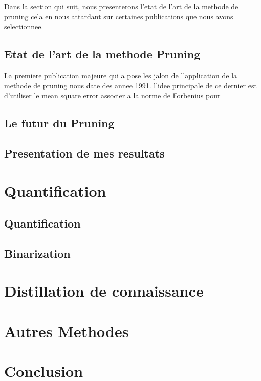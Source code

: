 \documentclass[twoside,twocolumn]{article}
\begin{document}
Dans la section qui suit, nous presenterons l'etat de l'art de la methode de pruning cela en nous  attardant sur certaines publications
que nous avons selectionnee.

\subsection{Etat de l'art de la methode Pruning}
La premiere publication majeure qui a pose les jalon de l'application de la methode de pruning nous date des annee 1991\cite{SYKung}. l'idee principale de ce dernier est 
d'utiliser le mean square error associer a la norme de Forbenius pour 

\subsection{Le futur du Pruning}
\subsection{Presentation de mes resultats}

\section{Quantification}%
\subsection{Quantification}
\subsection{Binarization}

\section{Distillation de connaissance} %


\section{Autres Methodes}%


\section{Conclusion}%



 

\end{document}
